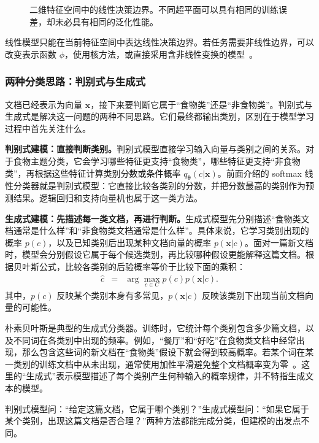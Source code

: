 \begin{figure}[htbp]
  \centering
  
  \caption{二维特征空间中的线性决策边界。不同超平面可以具有相同的训练误差，却未必具有相同的泛化性能。}
  \label{fig:aml-separating-hyperplanes}
\end{figure}

线性模型只能在当前特征空间中表达线性决策边界。若任务需要非线性边界，可以改变表示函数 $\phi$，使用核方法，或直接采用含非线性变换的模型~\cite{Cortes-and-Vapnik:1995}。

\subsubsection{两种分类思路：判别式与生成式}

文档已经表示为向量 $\mathbf{x}$，接下来要判断它属于“食物类”还是“非食物类”。判别式与生成式是解决这一问题的两种不同思路。它们最终都输出类别，区别在于模型学习过程中首先关注什么。

\textbf{判别式建模：直接判断类别。}判别式模型直接学习输入向量与类别之间的关系。对于食物主题分类，它会学习哪些特征更支持“食物类”，哪些特征更支持“非食物类”，再根据这些特征计算类别分数或条件概率 $q_{\boldsymbol{\theta}}(c|\mathbf{x})$。前面介绍的 softmax 线性分类器就是判别式模型：它直接比较各类别的分数，并把分数最高的类别作为预测结果。逻辑回归和支持向量机也属于这一类方法。

\textbf{生成式建模：先描述每一类文档，再进行判断。}生成式模型先分别描述“食物类文档通常是什么样”和“非食物类文档通常是什么样”。具体来说，它学习类别出现的概率 $p(c)$，以及已知类别后出现某种文档向量的概率 $p(\mathbf{x}|c)$。面对一篇新文档时，模型会分别假设它属于每个候选类别，再比较哪种假设更能解释这篇文档。根据贝叶斯公式，比较各类别的后验概率等价于比较下面的乘积：
\begin{eqnarray}
\hat{c}
& = &
\arg\max_{c\in C}p(c)p(\mathbf{x}|c).
\end{eqnarray}
其中，$p(c)$ 反映某个类别本身有多常见，$p(\mathbf{x}|c)$ 反映该类别下出现当前文档向量的可能性。

朴素贝叶斯是典型的生成式分类器。训练时，它统计每个类别包含多少篇文档，以及不同词在各类别中出现的频率。例如，“餐厅”和“好吃”在食物类文档中经常出现，那么包含这些词的新文档在“食物类”假设下就会得到较高概率。若某个词在某一类别的训练文档中从未出现，通常使用加性平滑避免整个文档概率变为零~\cite{Chen-and-Goodman:1999}。这里的“生成式”表示模型描述了每个类别产生何种输入的概率规律，并不特指生成文本的模型。

\begin{importantnote}
  判别式模型问：“给定这篇文档，它属于哪个类别？”生成式模型问：“如果它属于某个类别，出现这篇文档是否合理？”两种方法都能完成分类，但建模的出发点不同。
\end{importantnote}

